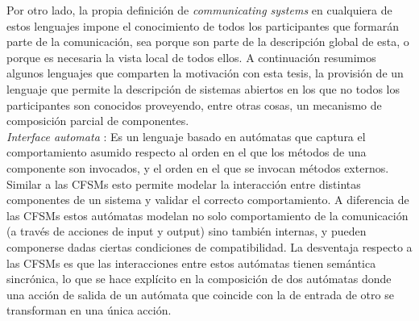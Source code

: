 Por otro lado, la propia definición de \emph{communicating systems} en cualquiera de estos lenguajes impone el conocimiento de todos los participantes que formarán parte de la comunicación, sea porque son parte de la descripción global de esta, o porque es necesaria la vista local de todos ellos. A continuación resumimos algunos lenguajes que comparten la motivación con esta tesis, la provisión de un lenguaje que permite la descripción de sistemas abiertos en los que no todos los participantes son conocidos proveyendo, entre otras cosas, un mecanismo de composición parcial de componentes.\\

\emph{Interface automata} \cite{dealfaro:esec-fse-01}: Es un lenguaje basado en autómatas que captura el comportamiento asumido respecto al orden en el que los métodos de una componente son invocados, y el orden en el que se invocan métodos externos. Similar a las CFSMs esto permite modelar la interacción entre distintas componentes de un sistema y validar el correcto comportamiento. A diferencia de las CFSMs estos autómatas modelan no solo comportamiento de la comunicación (a través de acciones de input y output) sino también internas, y pueden componerse dadas ciertas condiciones de compatibilidad. La desventaja respecto a las CFSMs es que las interacciones entre estos autómatas tienen semántica sincrónica, lo que se hace explícito en la composición de dos autómatas donde una acción de salida de un autómata que coincide con la de entrada de otro se transforman en una única acción.\\

